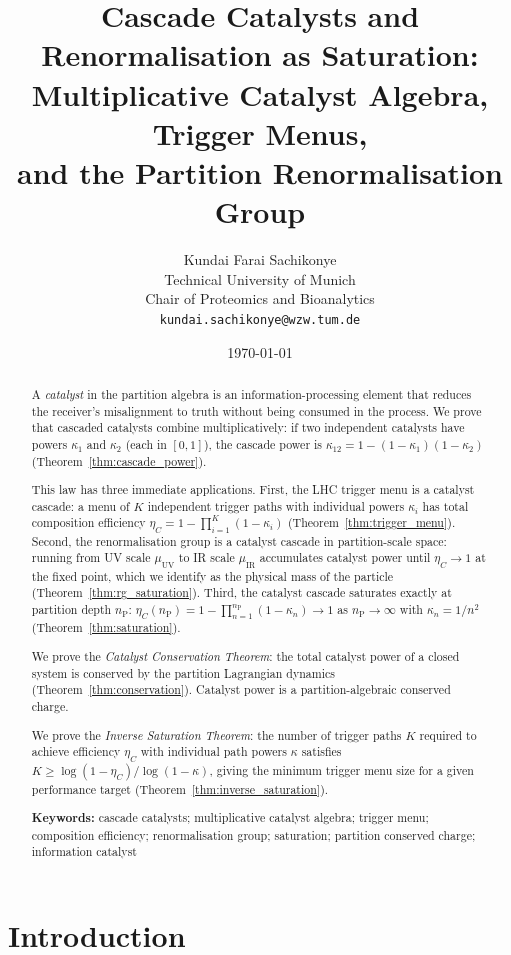 \documentclass[twocolumn,10pt,a4paper]{article}
\title{\textbf{Cascade Catalysts and Renormalisation as Saturation:\\
Multiplicative Catalyst Algebra, Trigger Menus,\\
and the Partition Renormalisation Group}}
\author{
Kundai Farai Sachikonye\\
Technical University of Munich\\
Chair of Proteomics and Bioanalytics\\
\texttt{kundai.sachikonye@wzw.tum.de}
}
\date{\today}
\theoremstyle{thmstyle}
\theoremstyle{definition}
\theoremstyle{remark}
\newcommand{\nP}{n_{\mathrm{P}}}
\newcommand{\catpow}{\kappa}
\newcommand{\etaC}{\eta_{C}}
\begin{document}
\maketitle

\begin{abstract}
\noindent
A \emph{catalyst} in the partition algebra is an information-processing
element that reduces the receiver's misalignment to truth without being
consumed in the process. We prove that cascaded catalysts combine
multiplicatively: if two independent catalysts have powers $\catpow_1$
and $\catpow_2$ (each in $[0,1]$), the cascade power is
$\catpow_{12} = 1 - (1-\catpow_1)(1-\catpow_2)$
(Theorem~\ref{thm:cascade_power}).

This law has three immediate applications. First, the LHC trigger menu
is a catalyst cascade: a menu of $K$ independent trigger paths with
individual powers $\catpow_i$ has total composition efficiency
$\etaC = 1 - \prod_{i=1}^K(1-\catpow_i)$
(Theorem~\ref{thm:trigger_menu}). Second, the renormalisation group
is a catalyst cascade in partition-scale space: running from UV scale
$\mu_{\mathrm{UV}}$ to IR scale $\mu_{\mathrm{IR}}$ accumulates catalyst
power until $\etaC \to 1$ at the fixed point, which we identify as the
physical mass of the particle (Theorem~\ref{thm:rg_saturation}).
Third, the catalyst cascade saturates exactly at partition depth $\nP$:
$\etaC(\nP) = 1 - \prod_{n=1}^{\nP}(1-\catpow_n) \to 1$
as $\nP \to \infty$ with $\catpow_n = 1/n^2$
(Theorem~\ref{thm:saturation}).

We prove the \emph{Catalyst Conservation Theorem}: the total catalyst
power of a closed system is conserved by the partition Lagrangian
dynamics (Theorem~\ref{thm:conservation}). Catalyst power is a
partition-algebraic conserved charge.

We prove the \emph{Inverse Saturation Theorem}: the number of trigger
paths $K$ required to achieve efficiency $\etaC$ with individual path
powers $\catpow$ satisfies $K \geq \log(1-\etaC)/\log(1-\catpow)$,
giving the minimum trigger menu size for a given performance target
(Theorem~\ref{thm:inverse_saturation}).

\medskip
\noindent\textbf{Keywords:} cascade catalysts; multiplicative catalyst
algebra; trigger menu; composition efficiency; renormalisation group;
saturation; partition conserved charge; information catalyst
\end{abstract}

\tableofcontents

\section{Introduction}
\label{sec:intro}
\end{document}
